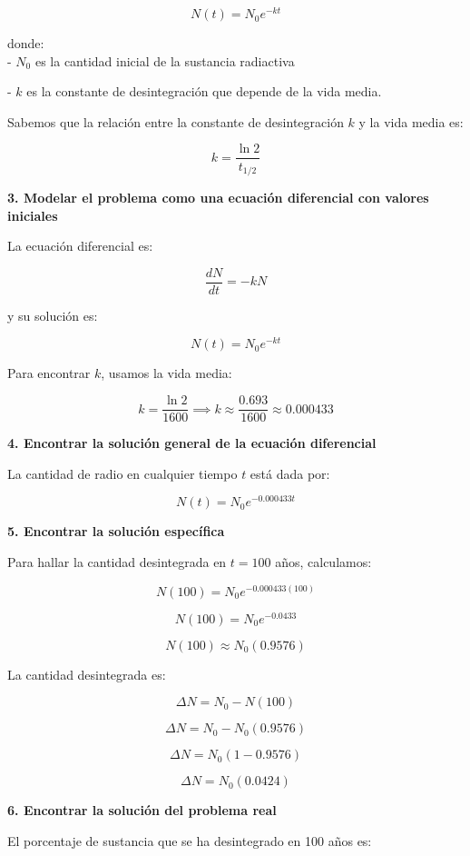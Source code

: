 \documentclass[answers]{exam}
\begin{document}
\[
	N(t) = N_0 e^{-kt}
\]

donde:\\

- \( N_0 \) es la cantidad inicial de la sustancia radiactiva

- \( k \) es la constante de desintegración que depende de la vida media.

Sabemos que la relación entre la constante de desintegración \( k \) y la vida media es:

\[
	k = \frac{\ln 2}{t_{1/2}}
\]

\vspace{0.3cm}
\textbf{3. Modelar el problema como una ecuación diferencial con valores iniciales}

La ecuación diferencial es:

\[
	\frac{dN}{dt} = -kN
\]

y su solución es:

\[
	N(t) = N_0 e^{-kt}
\]

Para encontrar \( k \), usamos la vida media:

\[
	k = \frac{\ln 2}{1600}
	\implies
	k \approx \frac{0.693}{1600} \approx 0.000433
\]

\vspace{0.3cm}
\textbf{4. Encontrar la solución general de la ecuación diferencial}

La cantidad de radio en cualquier tiempo \( t \) está dada por:

\[
	N(t) = N_0 e^{-0.000433t}
\]

\vspace{0.3cm}
\textbf{5. Encontrar la solución específica}

Para hallar la cantidad desintegrada en \( t = 100 \) años, calculamos:

\[
	N(100) = N_0 e^{-0.000433(100)}
\]

\[N(100)= N_0 e^{-0.0433}\]

\[N(100) \approx N_0 (0.9576)\]

La cantidad desintegrada es:

\[
	\Delta N = N_0 - N(100)
\]

\[
	\Delta N = N_0 - N_0(0.9576)
\]

\[
	\Delta N = N_0 (1 - 0.9576)
\]

\[
	\Delta N = N_0 (0.0424)
\]

\vspace{0.3cm}
\textbf{6. Encontrar la solución del problema real}

El porcentaje de sustancia que se ha desintegrado en 100 años es:
\end{document}
